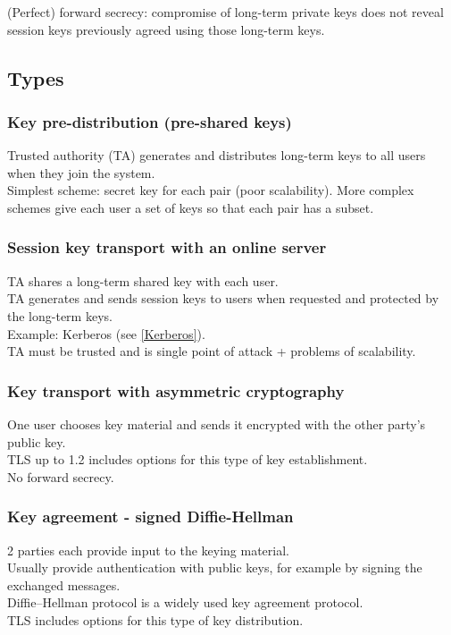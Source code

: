 \documentclass{article}
\begin{document}
(Perfect) forward secrecy: compromise of long-term private keys does not reveal session keys previously agreed using those long-term keys.

\subsection{Types}

\subsubsection{Key pre-distribution (pre-shared keys)}

Trusted authority (TA) generates and distributes long-term keys to all users when they join the system.\\
Simplest scheme: secret key for each pair (poor scalability). More complex schemes give each user a set of keys so that each pair has a subset.

\subsubsection{Session key transport with an online server}

TA shares a long-term shared key with each user.\\
TA generates and sends session keys to users when requested and protected by the long-term keys.\\
Example: Kerberos (see \ref{Kerberos}).\\
TA must be trusted and is single point of attack + problems of scalability.

\subsubsection{Key transport with asymmetric cryptography}

One user chooses key material and sends it encrypted with the other party's public key.\\
TLS up to 1.2 includes options for this type of key establishment.\\
No forward secrecy.

\subsubsection{Key agreement - signed Diffie-Hellman}

2 parties each provide input to the keying material.\\
Usually provide authentication with public keys, for example by signing the exchanged messages.\\
Diffie–Hellman protocol is a widely used key agreement protocol.\\
TLS includes options for this type of key distribution.
\end{document}

